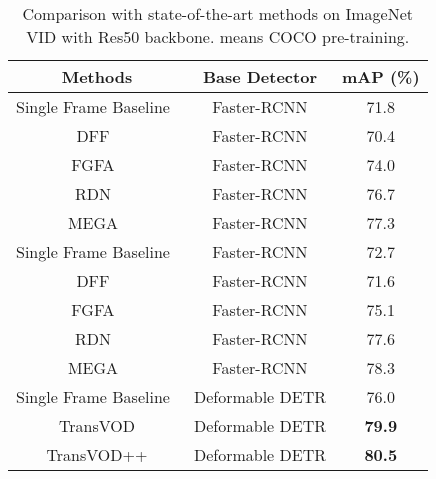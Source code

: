 \documentclass[10pt,journal,compsoc]{IEEEtran}
\begin{document}
\begin{table}[t!]
\caption{
Comparison with state-of-the-art methods on ImageNet VID with Res50 backbone.  means COCO pre-training.}
\footnotesize
\vspace{-3mm}
\begin{center}
\begin{tabular}{c|c|c}
\toprule
Methods& Base Detector  & mAP (\%) \\
\midrule
Single Frame Baseline~\cite{ren2016faster} &  Faster-RCNN & 71.8 \\
DFF~\cite{zhu17dff}  & Faster-RCNN &70.4\\
FGFA~\cite{zhu17fgfa}  & Faster-RCNN &74.0\\
RDN~\cite{deng19rdn} &  Faster-RCNN & 76.7\\
MEGA~\cite{chen2020memory}  & Faster-RCNN & 77.3\\
\midrule
Single Frame Baseline~\cite{ren2016faster} &  Faster-RCNN & 72.7\\
DFF~\cite{zhu17dff}  & Faster-RCNN &71.6\\
FGFA~\cite{zhu17fgfa}  & Faster-RCNN &75.1\\
RDN~\cite{deng19rdn} &  Faster-RCNN & 77.6\\
MEGA~\cite{chen2020memory}  & Faster-RCNN & 78.3\\
\midrule
Single Frame Baseline~\cite{zhu2020deformable}  & Deformable DETR & 76.0 \\
TransVOD &  Deformable DETR  & \textbf{79.9} \\
TransVOD++ &  Deformable DETR  & \textbf{80.5} \\
\bottomrule
\end{tabular}
\end{center}
\label{table:mainresult_r50}
\vspace{-1mm}
\end{table}
\end{document}
